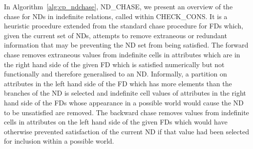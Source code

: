 In Algorithm~\ref{alg:cp_ndchase}, ND\_CHASE, we present an overview
of the chase for NDs in indefinite relations, 
called within CHECK\_CONS. It is a heuristic procedure extended from the
standard chase procedure for FDs \cite{bv84,Mann92} which, given the
current set of NDs, attempts to remove extraneous or redundant information that
may be preventing the ND set from being satisfied. The forward chase removes extraneous values
from indefinite cells in attributes which are in the right hand
side of the given FD which is satisfied numerically but not functionally and 
therefore generalised to an ND.  Informally, a partition on attributes
in the left
hand side of the FD which has more elements than the branches of the ND is selected
and indefinite cell values of attributes in the right hand side of the
FDs whose appearance in a possible world would cause the ND to
be unsatisfied are removed. The backward chase removes values from
indefinite cells in attributes on the left hand side of the given
FDs which would have otherwise prevented satisfaction of the current
ND if that value had been selected for inclusion within a possible world.



